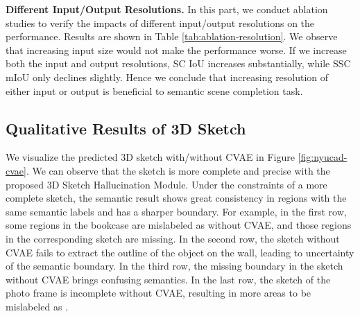 \documentclass[10pt,twocolumn,letterpaper]{article}
\begin{document}
\begin{table}[t]
\begin{center}
\vspace{-0.2cm}
\end{center}
\caption{\textbf{Ablation studies on input/output resolutions}. We perform this ablation study on NYU and NYUCAD dataset both. \textit{Resolution(a, b)} means the input resolution is  and the output resolution is .}
\label{tab:ablation-resolution}
\end{table} 
\noindent \textbf{Different Input/Output Resolutions.} In this part, we conduct ablation studies to verify the impacts of different input/output resolutions on the performance. Results are shown in Table \ref{tab:ablation-resolution}. We observe that increasing input size would not make the performance worse. If we increase both the input and output resolutions, SC IoU increases substantially, while SSC mIoU only declines slightly. Hence we conclude that increasing resolution of either input or output is beneficial to semantic scene completion task.


\subsection{Qualitative Results of 3D Sketch}
We visualize the predicted 3D sketch with/without CVAE in Figure \ref{fig:nyucad-cvae}. We can observe that the sketch is more complete and precise with the proposed 3D Sketch Hallucination Module. Under the constraints of a more complete sketch, the semantic result shows great consistency in regions with the same semantic labels and has a sharper boundary. For example, in the first row, some regions in the bookcase are mislabeled as  without CVAE, and those regions in the corresponding sketch are missing. In the second row, the sketch without CVAE fails to extract the outline of the object on the wall, leading to uncertainty of the semantic boundary. In the third row, the missing boundary in the sketch without CVAE brings confusing semantics. In the last row, the sketch of the photo frame is incomplete without CVAE, resulting in more areas to be mislabeled as .
\end{document}
